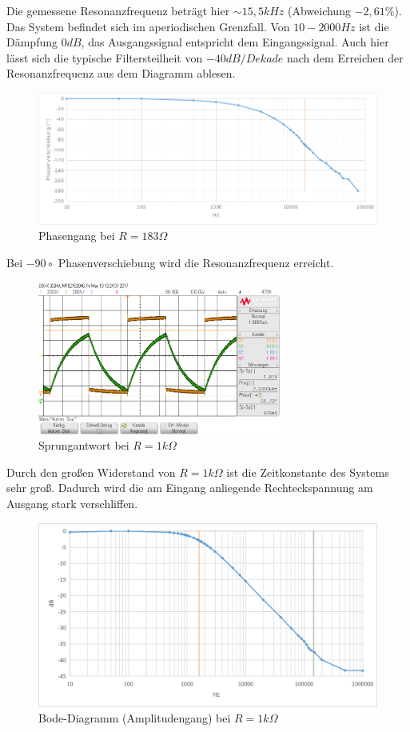 \documentclass[12pt,a4paper,titlepage]{article}
\begin{document}
\noindent Die gemessene Resonanzfrequenz betr\"agt hier $\sim15,5kHz$ (Abweichung $-2,61\%$). Das System befindet sich im aperiodischen Grenzfall. Von $10-2000Hz$ ist die Dämpfung $0dB$, das Ausgangssignal entspricht dem Eingangssignal. Auch hier lässt sich die typische Filtersteilheit von $-40dB/Dekade$ nach dem Erreichen der Resonanzfrequenz aus dem Diagramm ablesen.

\begin{figure}[H]
  \centering
  \includegraphics[width=150mm]{phasengang_rlc_180.png}
  \caption{Phasengang bei $R=183\Omega$}
\end{figure}

\noindent Bei $-90{\circ}$ Phasenverschiebung wird die Resonanzfrequenz erreicht.

\begin{figure}[H]
  \centering
  \includegraphics[width=80mm]{sprungantwort_rlc_1k.png}
  \caption{Sprungantwort bei $R=1k\Omega$}
\end{figure}
\noindent Durch den großen Widerstand von $R=1k\Omega$ ist die Zeitkonstante des Systems sehr groß. Dadurch wird die am Eingang anliegende Rechteckspannung am Ausgang stark verschliffen.

\begin{figure}[H]
  \centering
  \includegraphics[width=150mm]{bode_rlc_1k.png}
  \caption{Bode-Diagramm (Amplitudengang) bei $R=1k\Omega$}
\end{figure}
\end{document}
